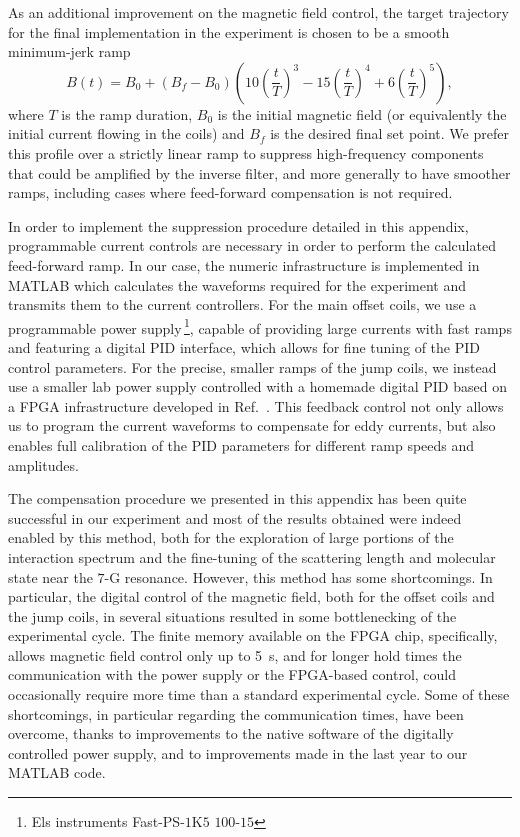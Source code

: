 As an additional improvement on the magnetic field control, the target trajectory for the final implementation in the experiment is chosen to be a smooth minimum-jerk ramp \cite{sharkawy2021mjt}
\begin{equation}
 B(t)=B_0+(B_{f}-B_0)\left(10	\left(\frac{t}{T}	\right)^3-15\left(\frac{t}{T}\right)^4+6\left(\frac{t}{T}\right)^5\right),
	\label{eq:MinJerkFun}
\end{equation}
where $T$ is the ramp duration, $B_0$ is the initial magnetic field (or equivalently the initial current flowing in the coils) and $B_{f}$ is the desired final set point. We prefer this profile over a strictly linear ramp to suppress high-frequency components that could be amplified by the inverse filter, and more generally to have smoother ramps, including cases where feed-forward compensation is not required.

In order to implement the suppression procedure detailed in this appendix, programmable current controls are necessary in order to perform the calculated feed-forward ramp. In our case, the numeric infrastructure is implemented in MATLAB which calculates the waveforms required for the experiment and transmits them to the current controllers. For the main offset coils, we use a programmable power supply\,\footnote{Els instruments Fast-PS-$1$K$5$ $100$-$15$}, capable of providing large currents with fast ramps and featuring a digital \ac{PID} interface, which allows for fine tuning of the \ac{PID} control parameters. For the precise, smaller ramps of the jump coils, we instead use a smaller lab 	power supply controlled with a homemade digital \ac{PID} based on a \ac{FPGA} infrastructure developed in Ref.~\cite{Thomas2020adf}. This feedback control not only allows us to program the current waveforms to compensate for eddy currents, but also enables full calibration of the \ac{PID} parameters for different ramp speeds and amplitudes.

The compensation procedure we presented in this appendix has been quite successful in our experiment and most of the results obtained were indeed enabled by this method, both for the exploration of large portions of the interaction spectrum and the fine-tuning of the scattering length and molecular state near the $7$-G resonance. However, this method has some shortcomings. In particular, the digital control of the magnetic field, both for the offset coils and the jump coils, in several situations resulted in some bottlenecking of the experimental cycle. The finite memory available on the \ac{FPGA} chip, specifically, allows magnetic field control only up to \SI{5}{s}, and for longer hold times the communication with the power supply or the \ac{FPGA}-based control, could occasionally require more time than a standard experimental cycle. Some of these shortcomings, in particular regarding the communication times, have been overcome, thanks to improvements to the native software of the digitally controlled power supply, and to improvements made in the last year to our MATLAB code. 

